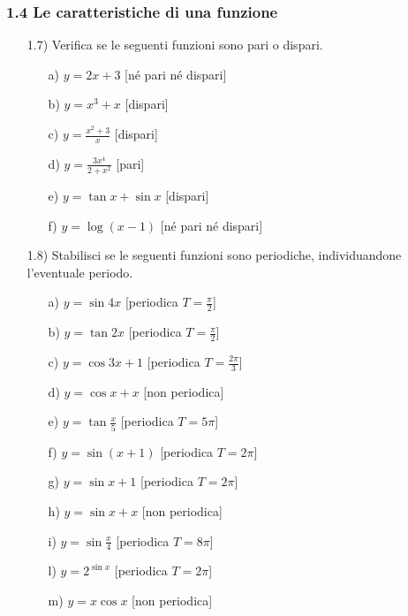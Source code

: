 \subsubsection*{1.4 Le caratteristiche di una funzione}
\begin{itemize}
  \item[1.7)] Verifica se le seguenti funzioni sono pari o dispari.
  \begin{itemize}
  \item[a)] \(y=2x+3\)   \hfill   
  [né pari né dispari]
  \item[b)] \(y=x^3+x\)   \hfill  
   [dispari]
  \item[c)] \(y=\frac{x^2+3}{x}\)   \hfill  
  [dispari]
  \item[d)] \(y=\frac{3x^4}{2+x^2} \)   \hfill  
   [pari]
  \item[e)] \(y=\tan{x}+\sin{x} \)   \hfill   
 [dispari]
  \item[f)] \(y= \log{(x-1)}\)   \hfill   
[né pari né dispari]
  \end{itemize}
  
  \item[1.8)] Stabilisci se le seguenti funzioni sono periodiche, 
individuandone l'eventuale periodo.
  \begin{itemize}
  \item[a)] \(y=\sin4x\)   \hfill   
  [periodica \(T=\frac{\pi}{2}\)]
  \item[b)] \(y=\tan2x\)   \hfill   
  [periodica \(T=\frac{\pi}{2}\)]
  \item[c)] \(y=\cos3x+1\)   \hfill   
   [periodica \(T=\frac{2\pi}{3}\)]
  \item[d)] \(y=\cos x+x \)   \hfill  
   [non periodica]
  \item[e)] \(y=\tan{\frac{x}{5}} \)   \hfill   
   [periodica \(T=5\pi\)]
  \item[f)] \(y= \sin(x+1)\)   \hfill   
[periodica \(T=2\pi\)]
  \item[g)] \(y= \sin x+1\)   \hfill   
[periodica \(T=2\pi\)]
  \item[h)] \(y= \sin x+x\)   \hfill   
[non periodica]
  \item[i)] \(y= \sin{\frac{x}{4}}\)   \hfill   
  [periodica \(T=8\pi\)]
  \item[l)] \(y= 2^{\sin{x}}\)   \hfill   
[periodica \(T=2\pi\)]
  \item[m)] \(y=x\cos x\)   \hfill   [non 
periodica]
  \end{itemize}
\end{itemize}

